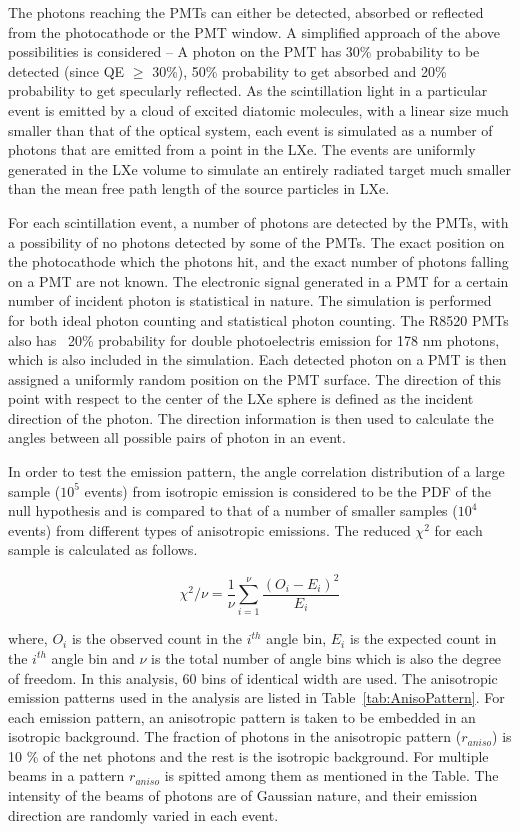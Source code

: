 The photons reaching the PMTs can either be detected, absorbed or reflected from the photocathode 
or the PMT window. A simplified approach of the above possibilities is considered -- 
A photon on the PMT has 30\% probability to be detected (since QE $\geq$ 30\%), 50\% probability to get 
absorbed and 20\% probability to get specularly reflected. As the scintillation light in a particular 
event is emitted by a cloud of excited diatomic molecules, with a linear size much smaller than that 
of the optical system, each event is simulated as a number of photons that are emitted from a point 
in the LXe. The events are uniformly generated in the LXe volume to simulate an entirely radiated 
target much smaller than the mean free path length of the source particles in LXe.

For each scintillation event, a number of photons are detected by the PMTs, with a possibility of 
no photons detected by some of the PMTs. The exact position on the photocathode which the photons hit, 
and the exact number of photons falling on a PMT are not known. The electronic signal generated in a PMT 
for a certain number of incident photon is statistical in nature. The simulation is performed for both 
ideal photon counting and statistical photon counting. The R8520 PMTs also has  ~20\% probability 
for double photoelectris emission for 178 nm photons, which is also included in the simulation.
Each detected photon 
on a PMT is then assigned a uniformly random position on the PMT surface. The direction of this point with respect 
to the center of the LXe sphere is defined as the incident direction of the photon. The direction information 
is then used to calculate the angles between all possible pairs of photon in an event.

In order to test the emission pattern, the angle correlation distribution of a large sample ($10^5$ events) 
from isotropic emission is considered to be the PDF of the null hypothesis and is compared 
to that of a number of smaller samples ($10^4$ events) from different types of anisotropic emissions. 
The reduced $\chi^2$ for each sample is calculated as follows.

\begin{equation}
\chi^2/\nu = \frac{1}{\nu} \sum^{\nu}_{i=1} \frac{(O_i - E_i)^2}{E_i}
\label{redchi2}
\end{equation}

where, $O_i$ is the observed count in the $i^{th}$ angle bin, $E_i$ is the expected count in the $i^{th}$ 
angle bin and $\nu$ is the total number of angle bins which is also the degree of freedom. In this analysis, 
60 bins of identical width are used. The anisotropic emission patterns used in the analysis are listed 
in Table~\ref{tab:AnisoPattern}. For each emission pattern,  an anisotropic pattern is taken to be embedded 
in an isotropic background. The fraction of photons in the anisotropic pattern ($r_{aniso}$) is 10 \% of the net photons 
and the rest is the isotropic background. For multiple beams in a pattern $r_{aniso}$ is spitted among them 
as mentioned in the Table. The intensity of the beams of photons are of Gaussian nature, and their emission direction are 
randomly varied in each event.

